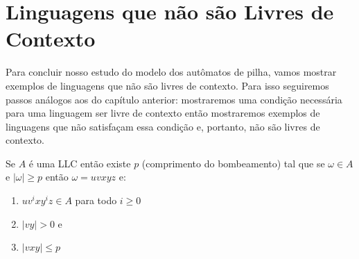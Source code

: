 \section{Linguagens que não são Livres de Contexto}
\label{sec:lnlc}

Para concluir nosso estudo do modelo dos autômatos de pilha, vamos mostrar exemplos de linguagens que não são livres de contexto.
Para isso seguiremos passos análogos aos do capítulo anterior: mostraremos uma condição necessária para uma linguagem ser livre de contexto então mostraremos exemplos de linguagens que não satisfaçam essa condição e, portanto, não são livres de contexto.

\begin{lemma}
  Se $A$ é uma LLC então existe $p$ (comprimento do bombeamento) tal que se $\omega \in A$ e $|\omega| \geq p$ então $\omega = uvxyz$ e:
  \begin{enumerate}
  \item $uv^ixy^iz \in A$ para todo $i \geq 0$
  \item $|vy| > 0$ e
  \item $|vxy| \leq p$
  \end{enumerate}
\end{lemma}

